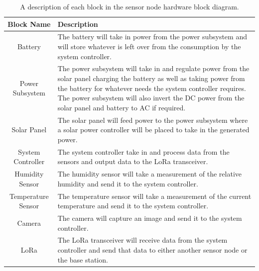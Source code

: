 \documentclass{article}
\begin{document}
\begin{table}[H]
    \centering
    \caption{A description of each block in the sensor node hardware block diagram.}
    \begin{tabularx}{\linewidth}{|c|X|}
        \hline
        Block Name & Description \\ 
        \hline
        Battery & The battery will take in power from the power subsystem and will store whatever is left over from the consumption by the system controller. \\\hline
        Power Subsystem & The power subsystem will take in and regulate power from the solar panel charging the battery as well as taking power from the battery for whatever needs the system controller requires. The power subsystem will also invert the DC power from the solar panel and battery to AC if required. \\\hline
        Solar Panel & The solar panel will feed power to the power subsystem where a solar power controller will be placed to take in the generated power. \\\hline
        System Controller & The system controller take in and process data from the sensors and output data to the LoRa transceiver. \\\hline
        Humidity Sensor & The humidity sensor will take a measurement of the relative humidity and send it to the system controller. \\\hline
        Temperature Sensor & The temperature sensor will take a measurement of the current temperature and send it to the system controller. \\\hline
        Camera & The camera will capture an image and send it to the system controller. \\\hline
        LoRa & The LoRa transceiver will receive data from the system controller and send that data to either another sensor node or the base station. \\\hline
    \end{tabularx}
    
    \label{tab:descHWNodeBD}
\end{table}
\end{document}
